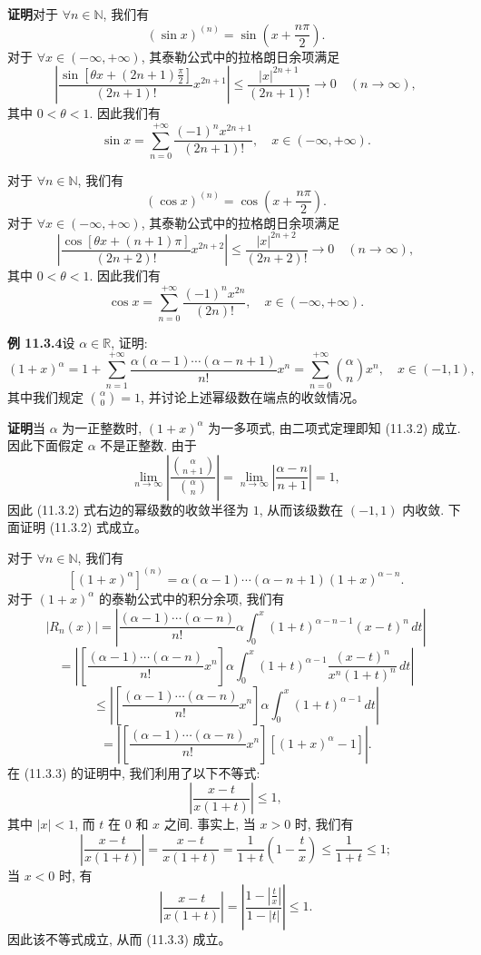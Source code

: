 \documentclass[UTF8,12pt,a4paper,fontset=fandol]{ctexart}
\begin{document}
\noindent\textbf{证明}\quad 对于 $\forall n\in\mathbb N$, 我们有
\[
  (\sin x)^{(n)}=\sin\left(x+\frac{n\pi}{2}\right).
\]
对于 $\forall x\in(-\infty,+\infty)$, 其泰勒公式中的拉格朗日余项满足
\[
  \left|
    \frac{\sin\left[\theta x+(2n+1)\frac{\pi}{2}\right]}{(2n+1)!}
    x^{2n+1}
  \right|
  \leqslant
  \frac{|x|^{2n+1}}{(2n+1)!}
  \to0\quad(n\to\infty),
\]
其中 $0<\theta<1$. 因此我们有
\[
  \sin x=\sum_{n=0}^{+\infty}\frac{(-1)^nx^{2n+1}}{(2n+1)!},
  \quad x\in(-\infty,+\infty).
\]

对于 $\forall n\in\mathbb N$, 我们有
\[
  (\cos x)^{(n)}=\cos\left(x+\frac{n\pi}{2}\right).
\]
对于 $\forall x\in(-\infty,+\infty)$, 其泰勒公式中的拉格朗日余项满足
\[
  \left|
    \frac{\cos[\theta x+(n+1)\pi]}{(2n+2)!}
    x^{2n+2}
  \right|
  \leqslant
  \frac{|x|^{2n+2}}{(2n+2)!}
  \to0\quad(n\to\infty),
\]
其中 $0<\theta<1$. 因此我们有
\[
  \cos x=\sum_{n=0}^{+\infty}\frac{(-1)^nx^{2n}}{(2n)!},
  \quad x\in(-\infty,+\infty).
\]

\noindent\textbf{例 11.3.4}\quad 设 $\alpha\in\mathbb R$, 证明:
\begin{equation}
  (1+x)^\alpha
  =
  1+\sum_{n=1}^{+\infty}
  \frac{\alpha(\alpha-1)\cdots(\alpha-n+1)}{n!}x^n
  =
  \sum_{n=0}^{+\infty}\binom{\alpha}{n}x^n,
  \quad x\in(-1,1),
  \tag{11.3.2}
\end{equation}
其中我们规定 $\binom{\alpha}{0}=1$, 并讨论上述幂级数在端点的收敛情况。

\noindent\textbf{证明}\quad 当 $\alpha$ 为一正整数时, $(1+x)^\alpha$ 为一多项式, 由二项式定理即知 (11.3.2) 成立. 因此下面假定 $\alpha$ 不是正整数. 由于
\[
  \lim_{n\to\infty}
  \left|
    \frac{\binom{\alpha}{n+1}}{\binom{\alpha}{n}}
  \right|
  =
  \lim_{n\to\infty}\left|\frac{\alpha-n}{n+1}\right|
  =1,
\]
因此 (11.3.2) 式右边的幂级数的收敛半径为 $1$, 从而该级数在 $(-1,1)$ 内收敛. 下面证明 (11.3.2) 式成立。

对于 $\forall n\in\mathbb N$, 我们有
\[
  [(1+x)^\alpha]^{(n)}
  =
  \alpha(\alpha-1)\cdots(\alpha-n+1)(1+x)^{\alpha-n}.
\]
对于 $(1+x)^\alpha$ 的泰勒公式中的积分余项, 我们有
\[
  |R_n(x)|
  =
  \left|
    \frac{(\alpha-1)\cdots(\alpha-n)}{n!}\alpha
    \int_0^x(1+t)^{\alpha-n-1}(x-t)^n\,dt
  \right|
\]
\[
  =
  \left|
    \left[\frac{(\alpha-1)\cdots(\alpha-n)}{n!}x^n\right]
    \alpha\int_0^x(1+t)^{\alpha-1}
    \frac{(x-t)^n}{x^n(1+t)^n}\,dt
  \right|
\]
\[
  \leqslant
  \left|
    \left[\frac{(\alpha-1)\cdots(\alpha-n)}{n!}x^n\right]
    \alpha\int_0^x(1+t)^{\alpha-1}\,dt
  \right|
\]
\[
  =
  \left|
    \left[\frac{(\alpha-1)\cdots(\alpha-n)}{n!}x^n\right]
    [(1+x)^\alpha-1]
  \right|.
  \tag{11.3.3}
\]
在 (11.3.3) 的证明中, 我们利用了以下不等式:
\[
  \left|\frac{x-t}{x(1+t)}\right|\leqslant1,
\]
其中 $|x|<1$, 而 $t$ 在 $0$ 和 $x$ 之间. 事实上, 当 $x>0$ 时, 我们有
\[
  \left|\frac{x-t}{x(1+t)}\right|
  =
  \frac{x-t}{x(1+t)}
  =
  \frac1{1+t}\left(1-\frac{t}{x}\right)
  \leqslant
  \frac1{1+t}
  \leqslant1;
\]
当 $x<0$ 时, 有
\[
  \left|\frac{x-t}{x(1+t)}\right|
  =
  \left|\frac{1-\left|\frac{t}{x}\right|}{1-|t|}\right|
  \leqslant1.
\]
因此该不等式成立, 从而 (11.3.3) 成立。
\end{document}
